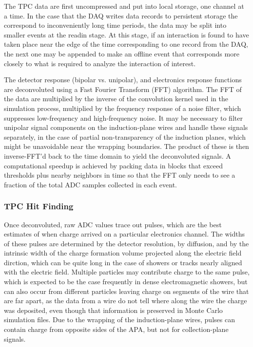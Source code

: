 The TPC data are first uncompressed and put into local storage, one
channel at a time.  In the case that the DAQ writes data records to persistent
storage the correspond to inconveniently long time periods, the data may be split
into smaller events at the readin stage.  At this stage, if an interaction is found
to have taken place near the edge of the time corresponding to one record from the DAQ,
the next one may be appended to make an offline event that corresponds more closely to
what is required to analyze the interaction of interest.

The detector response (bipolar vs. unipolar), and
electronics response functions are deconvoluted using a Fast Fourier
Transform (FFT) algorithm.  The FFT of the data are multiplied by the
inverse of the convolution kernel used in the simulation process,
multiplied by the frequency response of a noise filter, which
suppresses low-frequency and high-frequency noise.  It may be
necessary to filter unipolar signal components on the induction-plane
wires and handle these signals separately, in the case of partial
non-transparency of the induction planes, which might be unavoidable
near the wrapping boundaries.  The product of these is then
inverse-FFT'd back to the time domain to yield the deconvoluted
signals.  A computational speedup is achieved by packing data in
blocks that exceed thresholds plus nearby neighbors in time so that
the FFT only needs to see a fraction of the total ADC samples
collected in each event.


\subsubsection{TPC Hit Finding}

Once deconvoluted, raw ADC values trace out pulses, which are the best
estimates of when charge arrived on a particular electronics channel.
The widths of these pulses are determined by the detector resolution,
by diffusion, and by the intrinsic width of the charge formation
volume projected along the electric field dirction, which can be quite
long in the case of showers or tracks nearly aligned with the electric
field.  Multiple particles may contribute charge to the same pulse,
which is expected to be the case frequently in dense electromagnetic
showers, but can also occur from different particles leaving charge on
segments of the wire that are far apart, as the data from a wire do
not tell where along the wire the charge was deposited, even though
that information is preserved in Monte Carlo simulation files.  Due to
the wrapping of the induction-plane wires, pulses can contain charge
from opposite sides of the APA, but not for collection-plane signals.


